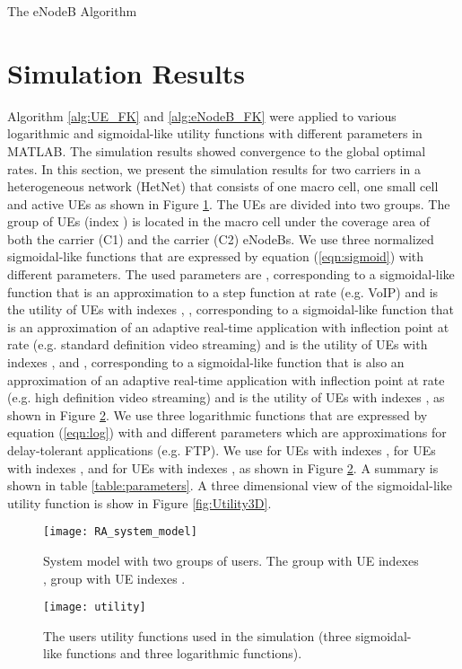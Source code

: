 \documentclass[journal]{IEEEtran} 		\usepackage{amsmath,amssymb}
\begin{document}
\begin{algorithm}[tb]
\caption{The  eNodeB Algorithm}\label{alg:eNodeB_FK}
\begin{algorithmic}
\LOOP
			\IF {} 
		\ELSE
\ENDIF
\ENDLOOP
\end{algorithmic}
\end{algorithm}

\section{Simulation Results}\label{sec:sim}

Algorithm \ref{alg:UE_FK} and \ref{alg:eNodeB_FK} were applied to various logarithmic and sigmoidal-like utility functions with different parameters in MATLAB. The simulation results showed convergence to the global optimal rates. In this section, we present the simulation results for two carriers in a heterogeneous network (HetNet) that consists of one macro cell, one small cell and  active UEs as shown in Figure \ref{fig:RA_system_model}. The UEs are divided into two groups. The  group of UEs (index ) is located in the macro cell under the coverage area of both the  carrier (C1) and the  carrier (C2) eNodeBs. We use three normalized sigmoidal-like functions that are expressed by equation (\ref{eqn:sigmoid}) with different parameters. The used parameters are ,  corresponding to a sigmoidal-like function that is an approximation to a step function at rate  (e.g. VoIP) and is the utility of UEs with indexes , , 
corresponding to a sigmoidal-like function that is an approximation of an adaptive real-time application with inflection point at rate  (e.g. standard definition video streaming) and is the utility of UEs with indexes , and ,   corresponding to a sigmoidal-like function that is also an approximation of an adaptive real-time application with inflection point at rate  (e.g. high definition video streaming) and is the utility of UEs with indexes , as shown in Figure \ref{fig:utility}. We use three logarithmic functions that are expressed by equation (\ref{eqn:log}) with  and different  parameters which are approximations for delay-tolerant applications (e.g. FTP). We use  for UEs with indexes ,  for UEs with indexes , and  for UEs with indexes , as shown in Figure \ref{fig:utility}. A summary is shown in table \ref{table:parameters}. A three dimensional view of the sigmoidal-like utility
function  is show in Figure \ref{fig:Utility3D}.
\begin{figure}[tb]
\centering
\texttt{[image: RA\_system\_model]}
\caption{System model with two groups of users. The  group with UE indexes ,  group with UE indexes .}
\label{fig:RA_system_model}
\end{figure}
\begin{figure}[tb]
\centering
\texttt{[image: utility]}
\caption{The users utility functions  used in the simulation (three sigmoidal-like functions and three logarithmic functions).}
\label{fig:utility}
\end{figure}
\end{document}
